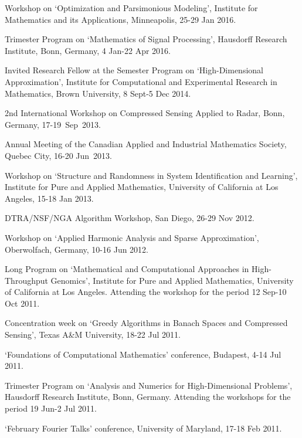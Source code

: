 \documentclass[11pt]{article}
\begin{document}
\item Workshop on `Optimization and Parsimonious Modeling', 
Institute for Mathematics and its Applications, Minneapolis, 25-29 Jan 2016.
\item Trimester Program on `Mathematics of Signal Processing', Hausdorff Research Institute, Bonn, Germany,
4 Jan-22 Apr 2016.
\item Invited Research Fellow at the Semester Program on `High-Dimensional Approximation', 
Institute for Computational and Experimental Research in Mathematics, Brown University,
8 Sept-5 Dec 2014.
\item 2nd International Workshop on Compressed Sensing Applied to Radar,
Bonn, Germany, 17-19~Sep~2013.
\item Annual Meeting of the Canadian Applied
and Industrial Mathematics Society, Quebec City, 16-20 Jun~2013. 
\item Workshop on `Structure and Randomness in System Identification and Learning',
Institute for Pure and Applied Mathematics, University of California at Los Angeles, 15-18 Jan 2013.
\item DTRA/NSF/NGA Algorithm Workshop, San Diego, 26-29 Nov 2012.
\item Workshop on `Applied Harmonic Analysis and Sparse Approximation', Oberwolfach, Germany, 10-16 Jun 2012.
\item Long Program on `Mathematical and Computational Approaches in High-Throughput Genomics', 
Institute for Pure and Applied Mathematics, University of California at Los Angeles.
Attending the workshop for the period 12 Sep-10 Oct 2011.
\item Concentration week on `Greedy Algorithms in Banach Spaces and Compressed Sensing', Texas A\&M University, 18-22 Jul 2011.
\item `Foundations of Computational Mathematics' conference, Budapest, 4-14 Jul 2011.
\item Trimester Program on `Analysis and Numerics for High-Dimensional Problems', Hausdorff Research Institute, Bonn, Germany.
Attending the workshops for the period 19 Jun-2 Jul 2011.
\item `February Fourier Talks' conference, University of Maryland, 17-18 Feb 2011.
\end{document}

